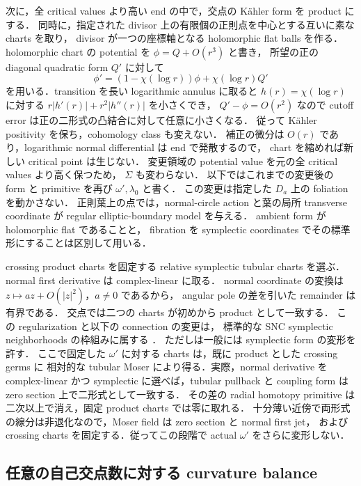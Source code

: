 次に，全 critical values より高い end の中で，交点の Kähler form を product にする．
同時に，指定された divisor 上の有限個の正則点を中心とする互いに素な charts を取り，
divisor が一つの座標軸となる holomorphic flat balls を作る．
holomorphic chart の potential を $\phi=Q+O(r^3)$ と書き，
所望の正の diagonal quadratic form $Q'$ に対して
\[
 \phi'=(1-\chi(\log r))\phi+\chi(\log r)Q'
\]
を用いる．transition を長い logarithmic annulus に取ると
$h(r)=\chi(\log r)$ に対する $r|h'(r)|+r^2|h''(r)|$ を小さくでき，
$Q'-\phi=O(r^2)$ なので cutoff error は正の二形式の凸結合に対して任意に小さくなる．
従って Kähler positivity を保ち，cohomology class も変えない．
補正の微分は $O(r)$ であり，logarithmic normal differential は end で発散するので，
chart を縮めれば新しい critical point は生じない．
変更領域の potential value を元の全 critical values より高く保つため，
$\Sigma$ も変わらない．
以下ではこれまでの変更後の form と primitive を再び $\omega',\lambda_0$ と書く．
この変更は指定した $D_a$ 上の foliation を動かさない．
正則葉上の点では，normal-circle action と葉の局所 transverse coordinate が
regular elliptic-boundary model を与える．
ambient form が holomorphic flat であることと，
fibration を symplectic coordinates でその標準形にすることは区別して用いる．

crossing product charts を固定する relative symplectic tubular charts を選ぶ．
normal first derivative は complex-linear に取る．
normal coordinate の変換は $z\mapsto a z+O(|z|^2)$，$a\neq0$ であるから，
angular pole の差を引いた remainder は有界である．
交点では二つの charts が初めから product として一致する．
この regularization と以下の connection の変更は，
標準的な SNC symplectic neighborhoods の枠組みに属する
\cite[\S2.4, Appendix A]{EM}\cite{TMZ}．
ただし\cite[Theorem 2.13]{TMZ}は一般には symplectic form の変形を許す．
ここで固定した $\omega'$ に対する charts は，既に product とした crossing germs に
相対的な tubular Moser により得る．実際，normal derivative を complex-linear かつ
symplectic に選べば，tubular pullback と coupling form は zero section 上で二形式として一致する．
その差の radial homotopy primitive は二次以上で消え，固定 product charts では零に取れる．
十分薄い近傍で両形式の線分は非退化なので，Moser field は zero section と normal first jet，
および crossing charts を固定する．従ってこの段階で actual $\omega'$ をさらに変形しない．

\subsection{任意の自己交点数に対する curvature balance}

